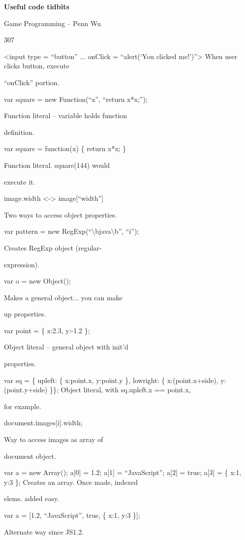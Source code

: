 \documentclass[
]{article}
\begin{document}
\textbf{Useful code tidbits}

Game Programming -- Penn Wu

307

\protect\hypertarget{index_split_015.htmlux5cux23p308}{}{}\textless input
type = ``button'' ... onClick = ``alert(`You clicked
me!')''\textgreater{} When user clicks button, execute

``onClick'' portion.

var square = new Function(``x'', ``return x*x;'');

Function literal -- variable holds function

definition.

var square = function(x) \{ return x*x; \}

Function literal. square(144) would

execute it.

image.width \textless-\textgreater{} image{[}``width''{]}

Two ways to access object properties.

var pattern = new RegExp(``\textbackslash bjava\textbackslash b'',
``i'');

Creates RegExp object (regular-

expression).

var o = new Object();

Makes a general object... you can make

up properties.

var point = \{ x:2.3, y:-1.2 \};

Object literal -- general object with init'd

properties.

var sq = \{ upleft: \{ x:point.x, y:point.y \}, lowright: \{
x:(point.x+side), y:(point.y+side) \}\}; Object literal, with
sq.upleft.x == point.x,

for example.

document.images{[}i{]}.width;

Way to access images as array of

document object.

var a = new Array(); a{[}0{]} = 1.2; a{[}1{]} = ``JavaScript''; a{[}2{]}
= true; a{[}3{]} = \{ x:1, y:3 \}; Creates an array. Once made, indexed

elems. added easy.

var a = {[}1.2, ``JavaScript'', true, \{ x:1, y:3 \}{]};

Alternate way since JS1.2.
\end{document}
